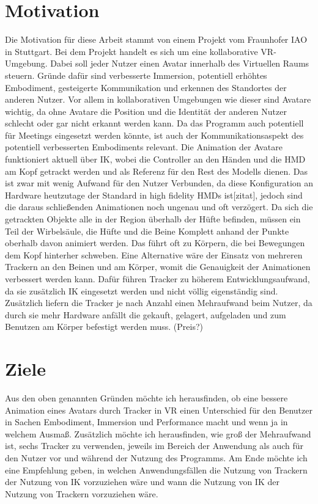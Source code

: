 \section{Motivation}
Die Motivation für diese Arbeit stammt von einem Projekt vom Fraunhofer IAO in Stuttgart. Bei dem Projekt handelt es sich um eine kollaborative VR-Umgebung. Dabei soll jeder Nutzer einen Avatar innerhalb des Virtuellen Raums steuern. 
Gründe dafür sind verbesserte Immersion, potentiell erhöhtes Embodiment, gesteigerte Kommunikation und erkennen des Standortes der anderen Nutzer. Vor allem in kollaborativen Umgebungen wie dieser sind Avatare wichtig, da ohne Avatare die Position und die Identität der anderen Nutzer schlecht oder gar nicht erkannt werden kann. Da das Programm auch potentiell für Meetings eingesetzt werden könnte, ist auch der Kommunikationsaspekt des potentiell verbesserten Embodiments relevant. Die Animation der Avatare funktioniert aktuell über IK, wobei die Controller an den Händen und die HMD am Kopf getrackt werden und als Referenz für den Rest des Modells dienen. Das ist zwar mit wenig Aufwand für den Nutzer Verbunden, da diese Konfiguration an Hardware heutzutage der Standard in high fidelity HMDs ist[zitat], jedoch sind die daraus schließenden Animationen noch ungenau und oft verzögert. Da sich die getrackten Objekte alle in der Region überhalb der Hüfte befinden, müssen ein Teil der Wirbelsäule, die Hüfte und die Beine Komplett anhand der Punkte oberhalb davon animiert werden. Das führt oft zu Körpern, die bei Bewegungen dem Kopf hinterher schweben.
Eine Alternative wäre der Einsatz von mehreren Trackern an den Beinen und am Körper, womit die Genauigkeit der Animationen verbessert werden kann. Dafür führen Tracker zu höherem Entwicklungsaufwand, da sie zusätzlich IK eingesetzt werden und nicht völlig eigenständig sind. Zusätzlich liefern die Tracker je nach Anzahl einen Mehraufwand beim Nutzer, da durch sie mehr Hardware anfällt die gekauft, gelagert, aufgeladen und zum Benutzen am Körper befestigt werden muss. (Preis?)


\section{Ziele}
Aus den oben genannten Gründen möchte ich herausfinden, ob eine bessere Animation eines Avatars durch Tracker in VR einen Unterschied für den Benutzer in Sachen Embodiment, Immersion und Performance macht und wenn ja in welchem Ausmaß. 
Zusätzlich möchte ich herausfinden, wie groß der Mehraufwand ist, sechs Tracker zu verwenden, jeweils im Bereich der Anwendung als auch für den Nutzer vor und während der Nutzung des Programms.
Am Ende möchte ich eine Empfehlung geben, in welchen Anwendungsfällen die Nutzung von Trackern der Nutzung von IK vorzuziehen wäre und wann die Nutzung von IK der Nutzung von Trackern vorzuziehen wäre.


